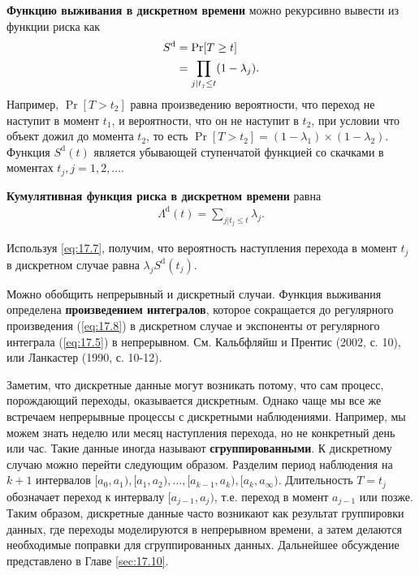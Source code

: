 \textbf{Функцию выживания в дискретном времени} можно рекурсивно вывести из функции риска как
    \begin{align}
    \label{eq:17.8}
    S^{\mathrm{d}} &= \Pr[T \ge t]\\
    &= \prod_{j|t_j \le t} (1 - \lambda_j). \notag
    \end{align}
Например, $\Pr{[T>t_2]}$ равна произведению вероятности, что переход не наступит в момент $t_1$, и вероятности, что он не наступит в $t_2$, при условии что объект дожил до момента $t_2$, то есть $\Pr{[T>t_2]}=(1-\lambda_1)\times(1-\lambda_2)$. Функция $S^\mathrm{d}(t)$ является убывающей ступенчатой функцией со скачками в моментах $t_j,j=1,2, \ldots .$

\textbf{Кумулятивная функция риска в дискретном времени} равна
    \begin{align}
    \label{eq:17.9}
    \Lambda^{\mathrm{d}}(t) = \sum_{j|t_j \le t} \lambda_j.
    \end{align}

Используя \ref{eq:17.7}, получим, что вероятность наступления перехода в момент $t_j$ в дискретном случае равна $\lambda_j S^\mathrm{d}(t_j).$

Можно обобщить непрерывный и дискретный случаи. Функция выживания определена \textbf{произведением интегралов}, которое сокращается до регулярного произведения (\ref{eq:17.8}) в дискретном случае и экспоненты от регулярного интеграла (\ref{eq:17.5}) в непрерывном. См. Кальбфляйш и Прентис (2002, с. 10), или Ланкастер (1990, с. 10-12).

Заметим, что дискретные данные могут возникать потому, что сам процесс, порождающий переходы, оказывается дискретным. Однако чаще мы все же встречаем непрерывные процессы с дискретными наблюдениями. Например, мы можем знать неделю или месяц наступления перехода, но не конкретный день или час. Такие данные иногда называют \textbf{сгруппированными}. К дискретному случаю можно перейти следующим образом. Разделим период наблюдения на $k + 1$ интервалов $[a_0,a_1), [a_1,a_2),  \ldots , [a_{k-1},a_{k}), [a_{k},a_{\infty})$. Длительность $T=t_j$ обозначает переход к интервалу $[a_{j-1},a_{j})$, т.е. переход в момент $a_{j-1}$ или позже. Таким образом, дискретные данные часто возникают как результат группировки данных, где переходы моделируются в непрерывном времени, а затем делаются необходимые поправки для сгруппированных данных. Дальнейшее обсуждение представлено в Главе \ref{sec:17.10}.




